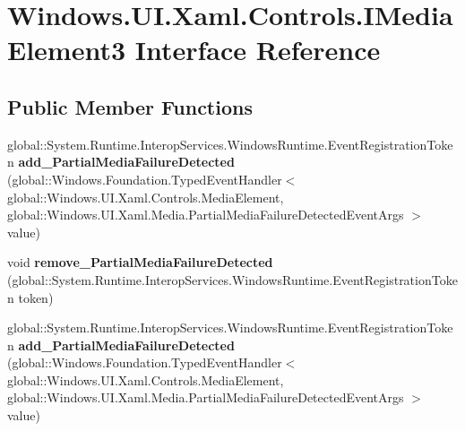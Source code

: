 \hypertarget{interface_windows_1_1_u_i_1_1_xaml_1_1_controls_1_1_i_media_element3}{}\section{Windows.\+U\+I.\+Xaml.\+Controls.\+I\+Media\+Element3 Interface Reference}
\label{interface_windows_1_1_u_i_1_1_xaml_1_1_controls_1_1_i_media_element3}
\subsection*{Public Member Functions}
\begin{DoxyCompactItemize}
\item 
\mbox{\label{interface_windows_1_1_u_i_1_1_xaml_1_1_controls_1_1_i_media_element3_a690260fef718dc5d1a0404578b728d57}} 
global\+::\+System.\+Runtime.\+Interop\+Services.\+Windows\+Runtime.\+Event\+Registration\+Token {\bfseries add\+\_\+\+Partial\+Media\+Failure\+Detected} (global\+::\+Windows.\+Foundation.\+Typed\+Event\+Handler$<$ global\+::\+Windows.\+U\+I.\+Xaml.\+Controls.\+Media\+Element, global\+::\+Windows.\+U\+I.\+Xaml.\+Media.\+Partial\+Media\+Failure\+Detected\+Event\+Args $>$ value)
\item 
\mbox{\label{interface_windows_1_1_u_i_1_1_xaml_1_1_controls_1_1_i_media_element3_a69e76e84315d2458547b9a6238fbbbf6}} 
void {\bfseries remove\+\_\+\+Partial\+Media\+Failure\+Detected} (global\+::\+System.\+Runtime.\+Interop\+Services.\+Windows\+Runtime.\+Event\+Registration\+Token token)
\item 
\mbox{\label{interface_windows_1_1_u_i_1_1_xaml_1_1_controls_1_1_i_media_element3_a690260fef718dc5d1a0404578b728d57}} 
global\+::\+System.\+Runtime.\+Interop\+Services.\+Windows\+Runtime.\+Event\+Registration\+Token {\bfseries add\+\_\+\+Partial\+Media\+Failure\+Detected} (global\+::\+Windows.\+Foundation.\+Typed\+Event\+Handler$<$ global\+::\+Windows.\+U\+I.\+Xaml.\+Controls.\+Media\+Element, global\+::\+Windows.\+U\+I.\+Xaml.\+Media.\+Partial\+Media\+Failure\+Detected\+Event\+Args $>$ value)
\item 

\end{DoxyCompactItemize}
